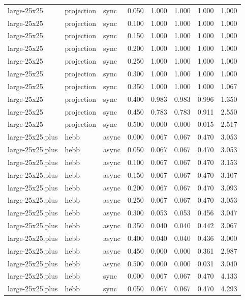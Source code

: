 \begin{tabular}{lllrrrrr}
large-25x25 & projection & sync & 0.050 & 1.000 & 1.000 & 1.000 & 1.000 \\
large-25x25 & projection & sync & 0.100 & 1.000 & 1.000 & 1.000 & 1.000 \\
large-25x25 & projection & sync & 0.150 & 1.000 & 1.000 & 1.000 & 1.000 \\
large-25x25 & projection & sync & 0.200 & 1.000 & 1.000 & 1.000 & 1.000 \\
large-25x25 & projection & sync & 0.250 & 1.000 & 1.000 & 1.000 & 1.000 \\
large-25x25 & projection & sync & 0.300 & 1.000 & 1.000 & 1.000 & 1.000 \\
large-25x25 & projection & sync & 0.350 & 1.000 & 1.000 & 1.000 & 1.067 \\
large-25x25 & projection & sync & 0.400 & 0.983 & 0.983 & 0.996 & 1.350 \\
large-25x25 & projection & sync & 0.450 & 0.783 & 0.783 & 0.911 & 2.550 \\
large-25x25 & projection & sync & 0.500 & 0.000 & 0.000 & 0.015 & 2.517 \\
large-25x25.plus & hebb & async & 0.000 & 0.067 & 0.067 & 0.470 & 3.053 \\
large-25x25.plus & hebb & async & 0.050 & 0.067 & 0.067 & 0.470 & 3.053 \\
large-25x25.plus & hebb & async & 0.100 & 0.067 & 0.067 & 0.470 & 3.153 \\
large-25x25.plus & hebb & async & 0.150 & 0.067 & 0.067 & 0.470 & 3.107 \\
large-25x25.plus & hebb & async & 0.200 & 0.067 & 0.067 & 0.470 & 3.093 \\
large-25x25.plus & hebb & async & 0.250 & 0.067 & 0.067 & 0.470 & 3.053 \\
large-25x25.plus & hebb & async & 0.300 & 0.053 & 0.053 & 0.456 & 3.047 \\
large-25x25.plus & hebb & async & 0.350 & 0.040 & 0.040 & 0.442 & 3.067 \\
large-25x25.plus & hebb & async & 0.400 & 0.040 & 0.040 & 0.436 & 3.000 \\
large-25x25.plus & hebb & async & 0.450 & 0.000 & 0.000 & 0.361 & 2.987 \\
large-25x25.plus & hebb & async & 0.500 & 0.000 & 0.000 & 0.031 & 3.040 \\
large-25x25.plus & hebb & sync & 0.000 & 0.067 & 0.067 & 0.470 & 4.133 \\
large-25x25.plus & hebb & sync & 0.050 & 0.067 & 0.067 & 0.470 & 4.293 \\

\end{tabular}
